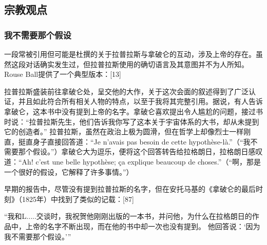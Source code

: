 \subsection{宗教观点}  
\subsubsection{我不需要那个假设}  
一段常被引用但可能是杜撰的关于拉普拉斯与拿破仑的互动，涉及上帝的存在。虽然这段对话确实发生过，但拉普拉斯使用的确切语言及其意图并不为人所知。Rouse Ball提供了一个典型版本：[13]  

拉普拉斯盛装前往拿破仑处，呈交他的大作，关于这次会面的叙述得到了广泛认证，并且如此符合所有相关人物的特点，以至于我将其完整引用。据说，有人告诉拿破仑，这本书中没有提到上帝的名字。拿破仑喜欢提出令人尴尬的问题，接过书时说：“拉普拉斯先生，他们告诉我你写了这本关于宇宙体系的大书，却从未提到它的创造者。” 拉普拉斯，虽然在政治上极为圆滑，但在哲学上却像烈士一样刚直，挺直身子直接回答道：“Je n'avais pas besoin de cette hypothèse-là.”（“我不需要那个假设。”）拿破仑大为逗乐，便将这个回答转告给拉格朗日，拉格朗日感叹道：“Ah! c'est une belle hypothèse; ça explique beaucoup de choses.”（“啊，那是一个很好的假设，它解释了许多事情。”）

早期的报告中，尽管没有提到拉普拉斯的名字，但在安托马基的《拿破仑的最后时刻》（1825年）中找到了类似的记载：[87]

“我和L.....交谈时，我祝贺他刚刚出版的一本书，并问他，为什么在拉格朗日的作品中，上帝的名字不断出现，而在他的书中却一次也没有提到。 他回答说：‘因为我不需要那个假设。’”